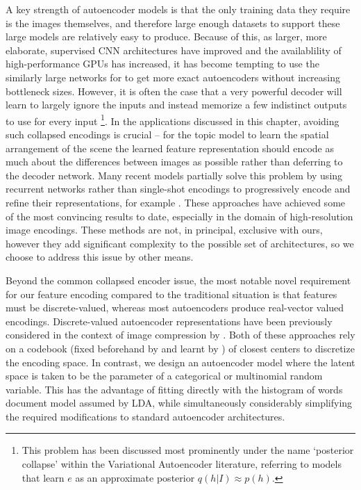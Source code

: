 A key strength of autoencoder models is that the only training data they require is the images themselves, and therefore large enough datasets to support these large models are relatively easy to produce. Because of this, as larger, more elaborate, supervised CNN architectures have improved and the availablility of high-performance GPUs has increased, it has become tempting to use the similarly large networks for to get more exact autoencoders without increasing bottleneck sizes. However, it is often the case that a very powerful decoder will learn to largely ignore the inputs and instead memorize a few indistinct outputs to use for every input \citep{vincent2010stacked,Chen2016}\footnote{This problem has been discussed most prominently under the name `posterior collapse' within the Variational Autoencoder literature, referring to models that learn $e$ as an approximate posterior $q(h | I) \approx p(h)$.}. In the applications discussed in this chapter, avoiding such collapsed encodings is crucial -- for the topic model to learn the spatial arrangement of the scene the learned feature representation should encode as much about the differences between images as possible rather than deferring to the decoder network. Many recent models partially solve this problem by using recurrent networks rather than single-shot encodings to progressively encode and refine their representations, for example \citep{OordPixelCNN,Chen2016,Gregor2016}. These approaches have achieved some of the most convincing results to date, especially in the domain of high-resolution image encodings. These methods are not, in principal, exclusive with ours, however they add significant complexity to the possible set of architectures, so we choose to address this issue by other means.

Beyond the common collapsed encoder issue, the most notable novel requirement for our feature encoding compared to the traditional situation is that features must be discrete-valued, whereas most autoencoders produce real-vector valued encodings. Discrete-valued autoencoder representations have been previously considered in the context of image compression by \citep{AgustssonSoftToHardVQ,vqvae2017}. Both of these approaches rely on a codebook (fixed beforehand by \citep{AgustssonSoftToHardVQ} and learnt by \citep{vqvae2017}) of closest centers to discretize the encoding space. In contrast, we design an autoencoder model where the latent space is taken to be the parameter of a categorical or multinomial random variable. This has the advantage of fitting directly with the histogram of words document model assumed by LDA, while simultaneously considerably simplifying the required modifications to standard autoencoder architectures.

